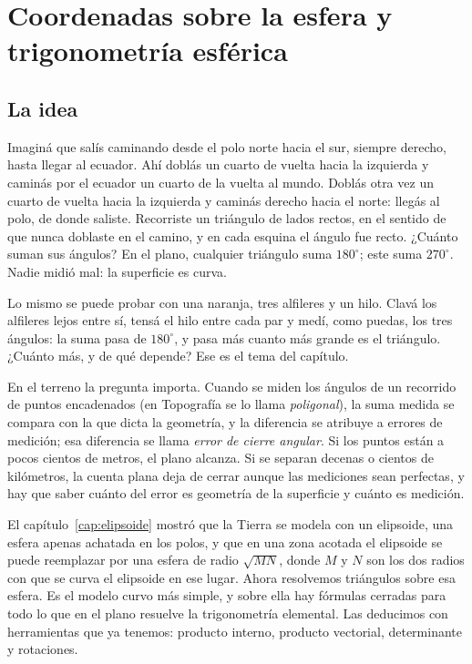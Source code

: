 \chapter{Coordenadas sobre la esfera y trigonometría esférica}\label{cap:esfera}

\section{La idea}

Imaginá que salís caminando desde el polo norte hacia el sur, siempre derecho, hasta llegar al
ecuador. Ahí doblás un cuarto de vuelta hacia la izquierda y caminás por el ecuador un cuarto
de la vuelta al mundo. Doblás otra vez un cuarto de vuelta hacia la izquierda y caminás
derecho hacia el norte: llegás al polo, de donde saliste. Recorriste un triángulo de lados
rectos, en el sentido de que nunca doblaste en el camino, y en cada esquina el ángulo fue
recto. ¿Cuánto suman sus ángulos? En el plano, cualquier triángulo suma \(180^\circ\); este
suma \(270^\circ\). Nadie midió mal: la superficie es curva.

Lo mismo se puede probar con una naranja, tres alfileres y un hilo. Clavá los alfileres lejos
entre sí, tensá el hilo entre cada par y medí, como puedas, los tres ángulos: la suma pasa de
\(180^\circ\), y pasa más cuanto más grande es el triángulo. ¿Cuánto más, y de qué depende?
Ese es el tema del capítulo.

En el terreno la pregunta importa. Cuando se miden los ángulos de un recorrido de puntos
encadenados (en Topografía se lo llama \emph{poligonal}), la suma medida se compara con la que dicta la geometría, y la diferencia se
atribuye a errores de medición; esa diferencia se llama \emph{error de cierre angular}. Si los
puntos están a pocos cientos de metros, el plano alcanza. Si se separan decenas o cientos de
kilómetros, la cuenta plana deja de cerrar aunque las mediciones sean perfectas, y hay que
saber cuánto del error es geometría de la superficie y cuánto es medición.

El capítulo~\ref{cap:elipsoide} mostró que la Tierra se modela con un elipsoide, una esfera
apenas achatada en los polos, y que en una zona acotada el elipsoide se puede reemplazar por
una esfera de radio \(\sqrt{MN}\), donde \(M\) y \(N\) son los dos radios con que se curva el
elipsoide en ese lugar. Ahora resolvemos triángulos sobre esa esfera. Es el modelo curvo más
simple, y sobre ella hay fórmulas cerradas para todo lo que en el plano resuelve la
trigonometría elemental. Las deducimos con herramientas que ya tenemos: producto interno,
producto vectorial, determinante y rotaciones.

